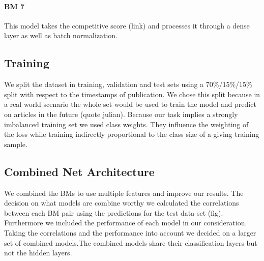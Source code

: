 \paragraph{BM 7} This model takes the competitive score (link) and processes it through a dense layer as well as batch normalization.

\subsection{Training}
We split the dataset in training, validation and test sets using a 70\%/15\%/15\% split with respect to the timestamps of publication. We chose this split because in a real world scenario the whole set would be used to train the model and predict on articles in the future (quote julian).
Because our task implies a strongly imbalanced training set we used class weights. They influence the weighting of the loss while training indirectly proportional to the class size of a giving training sample.

\subsection{Combined Net Architecture}
We combined the BMs to use multiple features and improve our results. The decision on what models are combine worthy we calculated the correlations between each BM pair using the predictions for the test data set (fig). Furthermore we included the performance of each model in our consideration. Taking the correlations and the performance into account we decided on a larger set of combined models.The combined models share their classification layers but not the hidden layers.
